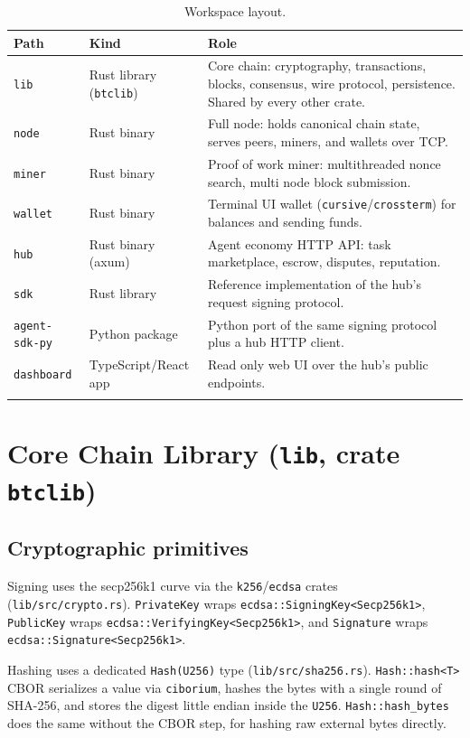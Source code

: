 \documentclass[11pt]{article}
\newcommand{\code}[1]{\texttt{#1}}
\begin{document}
\begin{longtable}{@{}p{2.6cm}p{2.6cm}p{9cm}@{}}
\toprule
\textbf{Path} & \textbf{Kind} & \textbf{Role} \\
\midrule
\endhead
\code{lib} & Rust library (\code{btclib}) & Core chain: cryptography, transactions, blocks, consensus, wire protocol, persistence. Shared by every other crate. \\
\code{node} & Rust binary & Full node: holds canonical chain state, serves peers, miners, and wallets over TCP. \\
\code{miner} & Rust binary & Proof of work miner: multithreaded nonce search, multi node block submission. \\
\code{wallet} & Rust binary & Terminal UI wallet (\code{cursive}/\code{crossterm}) for balances and sending funds. \\
\code{hub} & Rust binary (axum) & Agent economy HTTP API: task marketplace, escrow, disputes, reputation. \\
\code{sdk} & Rust library & Reference implementation of the hub's request signing protocol. \\
\code{agent-sdk-py} & Python package & Python port of the same signing protocol plus a hub HTTP client. \\
\code{dashboard} & TypeScript/React app & Read only web UI over the hub's public endpoints. \\
\bottomrule
\caption{Workspace layout.}
\label{tab:layout}
\end{longtable}

\section{Core Chain Library (\code{lib}, crate \code{btclib})}

\subsection{Cryptographic primitives}

Signing uses the secp256k1 curve via the \code{k256}/\code{ecdsa} crates (\code{lib/src/crypto.rs}). \code{PrivateKey} wraps \code{ecdsa::SigningKey<Secp256k1>}, \code{PublicKey} wraps \code{ecdsa::VerifyingKey<Secp256k1>}, and \code{Signature} wraps \code{ecdsa::Signature<Secp256k1>}.

Hashing uses a dedicated \code{Hash(U256)} type (\code{lib/src/sha256.rs}). \code{Hash::hash<T>} CBOR serializes a value via \code{ciborium}, hashes the bytes with a single round of SHA-256, and stores the digest little endian inside the \code{U256}. \code{Hash::hash_bytes} does the same without the CBOR step, for hashing raw external bytes directly.
\end{document}
